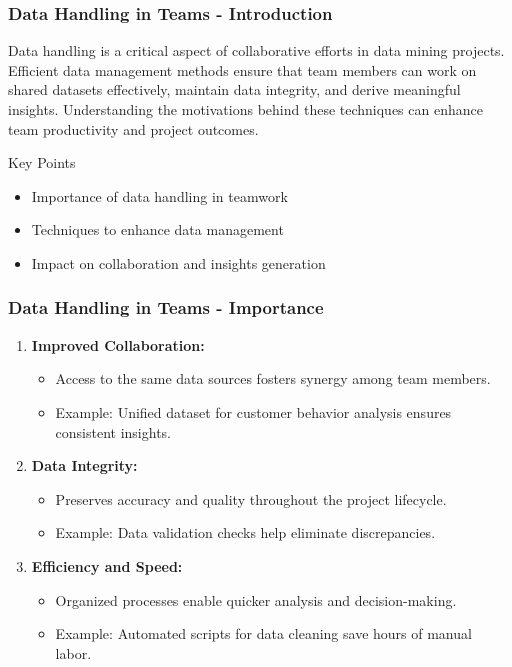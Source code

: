 \documentclass[aspectratio=169]{beamer}
\begin{document}
\begin{frame}[fragile]
    \frametitle{Data Handling in Teams - Introduction}
    Data handling is a critical aspect of collaborative efforts in data mining projects. Efficient data management methods ensure that team members can work on shared datasets effectively, maintain data integrity, and derive meaningful insights. Understanding the motivations behind these techniques can enhance team productivity and project outcomes.
    
    \begin{block}{Key Points}
        \begin{itemize}
            \item Importance of data handling in teamwork
            \item Techniques to enhance data management
            \item Impact on collaboration and insights generation
        \end{itemize}
    \end{block}
\end{frame}

\begin{frame}[fragile]
    \frametitle{Data Handling in Teams - Importance}
    \begin{enumerate}
        \item \textbf{Improved Collaboration:}
            \begin{itemize}
                \item Access to the same data sources fosters synergy among team members.
                \item Example: Unified dataset for customer behavior analysis ensures consistent insights.
            \end{itemize}
        
        \item \textbf{Data Integrity:}
            \begin{itemize}
                \item Preserves accuracy and quality throughout the project lifecycle.
                \item Example: Data validation checks help eliminate discrepancies.
            \end{itemize}
        
        \item \textbf{Efficiency and Speed:}
            \begin{itemize}
                \item Organized processes enable quicker analysis and decision-making.
                \item Example: Automated scripts for data cleaning save hours of manual labor.
            \end{itemize}
    \end{enumerate}
\end{frame}
\end{document}
